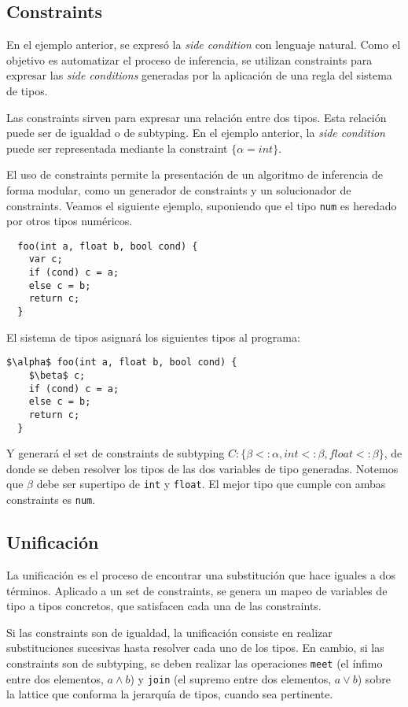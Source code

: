 \subsection{Constraints}
En el ejemplo anterior, se expresó la \textit{side condition} con lenguaje natural. Como el objetivo es automatizar el proceso de inferencia, se utilizan constraints para expresar las \textit{side conditions} generadas por la aplicación de una regla del sistema de tipos.

Las constraints sirven para expresar una relación entre dos tipos. Esta relación puede ser de igualdad o de subtyping. En el ejemplo anterior, la \textit{side condition} puede ser representada mediante la constraint $\{\alpha = int\}$.

El uso de constraints permite la presentación de un algoritmo de inferencia de forma modular, como un generador de constraints y un solucionador de constraints. Veamos el siguiente ejemplo, suponiendo que el tipo \texttt{num} es heredado por otros tipos numéricos.

\begin{lstlisting}
  foo(int a, float b, bool cond) {
    var c;
    if (cond) c = a;
    else c = b;
    return c;
  }
\end{lstlisting}

El sistema de tipos asignará los siguientes tipos al programa:
\begin{lstlisting}[mathescape=true]
  $\alpha$ foo(int a, float b, bool cond) {
    $\beta$ c;
    if (cond) c = a;
    else c = b;
    return c;
  }
\end{lstlisting}
Y generará el set de constraints de subtyping $C: \{\beta <: \alpha, int <: \beta, float <: \beta\}$, de donde se deben resolver los tipos de las dos variables de tipo generadas. Notemos que $\beta$ debe ser supertipo de \texttt{int} y \texttt{float}. El mejor tipo que cumple con ambas constraints es \texttt{num}.
\subsection{Unificación}
La unificación es el proceso de encontrar una substitución que hace iguales a dos términos. Aplicado a un set de constraints, se genera un mapeo de variables de tipo a tipos concretos, que satisfacen cada una de las constraints.

Si las constraints son de igualdad, la unificación consiste en realizar substituciones sucesivas hasta resolver cada uno de los tipos. En cambio, si las constraints son de subtyping, se deben realizar las operaciones \texttt{meet} (el ínfimo entre dos elementos, $a \wedge b$) y \texttt{join} (el supremo entre dos elementos, $a \vee b$) sobre la lattice que conforma la jerarquía de tipos, cuando sea pertinente.

